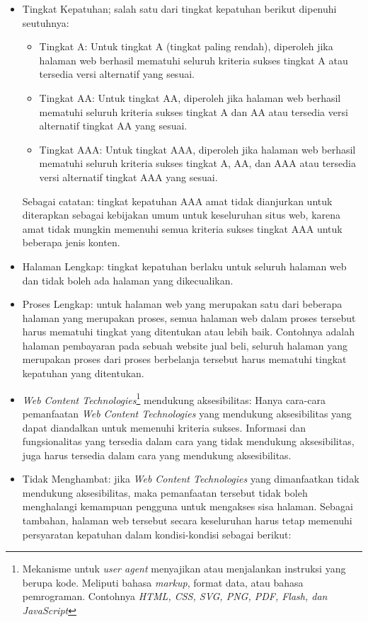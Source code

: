 \begin{itemize}
	\item Tingkat Kepatuhan; salah satu dari tingkat kepatuhan berikut dipenuhi seutuhnya:
	\begin{itemize}
		\item Tingkat A: Untuk tingkat A (tingkat paling rendah), diperoleh jika halaman web berhasil mematuhi seluruh kriteria sukses tingkat A atau tersedia versi alternatif yang sesuai.
		\item Tingkat AA: Untuk tingkat AA, diperoleh jika halaman web berhasil mematuhi seluruh kriteria sukses tingkat A dan AA atau tersedia versi alternatif tingkat AA yang sesuai.
		\item Tingkat AAA: Untuk tingkat AAA, diperoleh jika halaman web berhasil mematuhi seluruh kriteria sukses tingkat A, AA, dan AAA atau tersedia versi alternatif tingkat AAA yang sesuai.
	\end{itemize}
	Sebagai catatan: tingkat kepatuhan AAA amat tidak dianjurkan untuk diterapkan sebagai kebijakan umum untuk keseluruhan situs web, karena amat tidak mungkin memenuhi semua kriteria sukses tingkat AAA untuk beberapa jenis konten.
	\item Halaman Lengkap: tingkat kepatuhan berlaku untuk seluruh halaman web dan tidak boleh ada halaman yang dikecualikan.
	\item Proses Lengkap: untuk halaman web yang merupakan satu dari beberapa halaman yang merupakan proses, semua halaman web dalam proses tersebut harus mematuhi tingkat yang ditentukan atau lebih baik. Contohnya adalah halaman pembayaran pada sebuah website jual beli, seluruh halaman yang merupakan proses dari proses berbelanja tersebut harus mematuhi tingkat kepatuhan yang ditentukan.
	\item \textit{Web Content Technologies}\footnote{Mekanisme untuk \textit{user agent} menyajikan atau menjalankan instruksi yang berupa kode. Meliputi bahasa \textit{markup}, format data, atau bahasa pemrograman. Contohnya \textit{HTML, CSS, SVG, PNG, PDF, Flash, dan JavaScript}} mendukung aksesibilitas: Hanya cara-cara pemanfaatan \textit{Web Content Technologies} yang mendukung aksesibilitas yang dapat diandalkan untuk memenuhi kriteria sukses. Informasi dan fungsionalitas yang tersedia dalam cara yang tidak mendukung aksesibilitas, juga harus tersedia dalam cara yang mendukung aksesibilitas.
	\item Tidak Menghambat: jika \textit{Web Content Technologies} yang dimanfaatkan tidak mendukung aksesibilitas, maka pemanfaatan tersebut tidak boleh menghalangi kemampuan pengguna untuk mengakses sisa halaman. Sebagai tambahan, halaman web tersebut secara keseluruhan harus tetap memenuhi persyaratan kepatuhan dalam kondisi-kondisi sebagai berikut:

\end{itemize}

